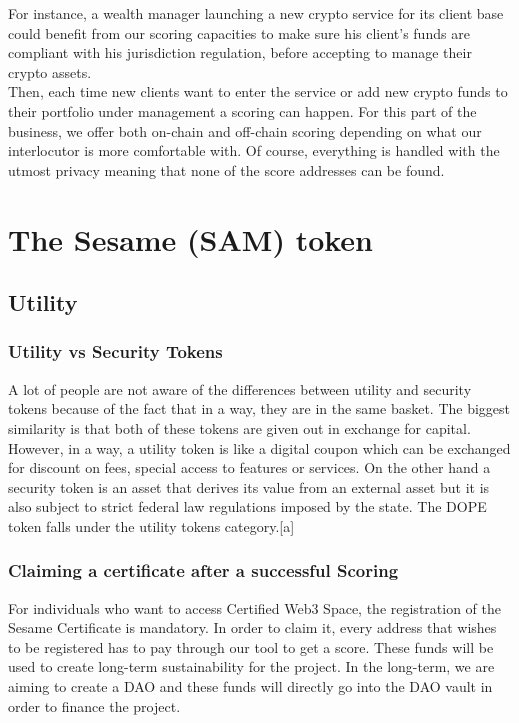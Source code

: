 ﻿\documentclass[a4paper]{article}
\begin{document}
For instance, a wealth manager launching a new crypto service for its client base could benefit from our scoring capacities to make sure his client's funds are compliant with his jurisdiction regulation, before accepting to manage their crypto assets. \\

Then, each time new clients want to enter the service or add new crypto funds to their portfolio under management a scoring can happen. For this part of the business, we offer both on-chain and off-chain scoring depending on what our interlocutor is more comfortable with. Of course, everything is handled with the utmost privacy meaning that none of the score addresses can be found.
\section{The Sesame (SAM) token}
\subsection{Utility}
\subsubsection{Utility vs Security Tokens}
A lot of people are not aware of the differences
between utility and security tokens because of
the fact that in a way, they are in the same basket.
The biggest similarity is that both of these tokens
are given out in exchange for capital. However, in
a way, a utility token is like a digital coupon which
can be exchanged for discount on fees, special
access to features or services. On the other hand
a security token is an asset that derives its value
from an external asset but it is also subject to strict
federal law regulations imposed by the state.
The DOPE token falls under the utility tokens
category.[a]


\subsubsection{Claiming a certificate after a successful Scoring}
For individuals who want to access Certified Web3 Space\texttrademark, the registration of the Sesame Certificate is mandatory. In order to claim it, every address that wishes to be registered has to pay through our tool to get a score. These funds will be used to create long-term sustainability for the project. In the long-term, we are aiming to create a DAO and these funds will directly go into the DAO vault in order to finance the project. 
\end{document}
